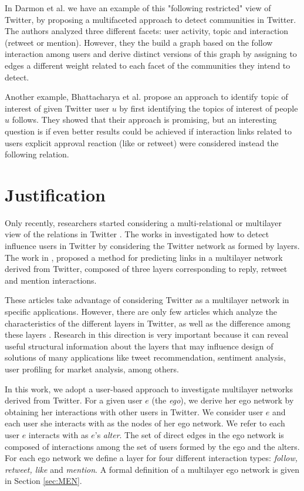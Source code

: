 In Darmon et al. \cite{Darmon2015} we have an example of this "following restricted" view of Twitter, by proposing a multifaceted approach to detect communities in Twitter. The authors analyzed three different facets: user activity, topic and interaction (retweet or mention). However, they  the build a graph based on the follow interaction among users and derive distinct versions of this graph by assigning  to edges a different weight related to each facet of the communities  they intend to detect.

Another example, Bhattacharya et al. \cite{Bhattacharya:2014} propose an approach to identify topic of interest of given Twitter user $u$ by first identifying the topics of interest of people $u$ follows. They showed that their approach is promising, but an interesting question is if even better results could be achieved if interaction links related to users explicit approval reaction (like or retweet) were considered instead the following relation. 




\section{Justification}
\label{sec:justification}

Only recently, researchers started considering a multi-relational or multilayer view of the relations in Twitter \cite{Azaza2015,Zhaoyun2013,Hajibagheri2016}. The works in \cite{Azaza2015, Zhaoyun2013} investigated how to detect influence users in Twitter by considering the Twitter network as formed by layers. The work in \cite{Hajibagheri2016}, proposed a method for predicting links in a multilayer network derived from Twitter, composed of three layers corresponding to reply, retweet and mention interactions.

These articles take advantage of considering Twitter as a multilayer network in specific applications. However, there are only few articles which analyze the characteristics of the different layers in Twitter, as well as the difference among these layers \cite{Omodei2015}. Research in this direction is very important because it can reveal useful structural information about the layers that may influence design of solutions of many applications like tweet recommendation, sentiment analysis, user profiling for market analysis, among others.

In this work, we adopt a user-based approach to investigate multilayer networks derived from Twitter. For a given user $e$ (the {\em ego}), we derive her ego network by obtaining her interactions with other users in Twitter. We consider user $e$ and each user she interacts with as the nodes of her ego network. We refer to each user $e$ interacts with as $e$'s {\em alter}. The set of direct edges in the ego network is composed of interactions among the set of users formed by the ego and the alters. For each ego network we define a layer for four different interaction types: {\em follow, retweet, like} and {\em mention}. A formal definition of a multilayer ego network is given in Section \ref{sec:MEN}.

